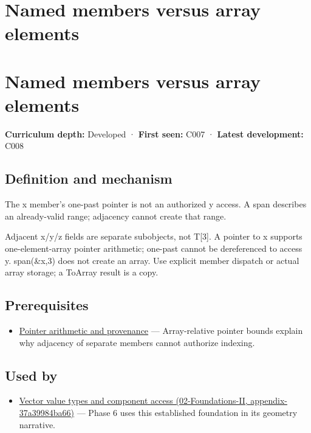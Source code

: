 \hypertarget{appendix-3f7e15effba6}{}
\section*{Named members versus array elements}
\section{Named members versus array elements}\label{appendix-3f7e15effba6-named-members-versus-array-elements}

\textbf{Curriculum depth:} Developed · \textbf{First seen:} C007 · \textbf{Latest development:} C008

\subsection{Definition and mechanism}\label{appendix-3f7e15effba6-definition-and-mechanism}

The x member's one-past pointer is not an authorized y access. A span describes an already-valid range; adjacency cannot create that range.

Adjacent x/y/z fields are separate subobjects, not T{[}3{]}. A pointer to x supports one-element-array pointer arithmetic; one-past cannot be dereferenced to access y. span(\&x,3) does not create an array. Use explicit member dispatch or actual array storage; a ToArray result is a copy.

\subsection{Prerequisites}\label{appendix-3f7e15effba6-prerequisites}

\begin{itemize}
\tightlist
\item
  \hyperref[appendix-6af5921bc853]{Pointer arithmetic and provenance} --- Array-relative pointer bounds explain why adjacency of separate members cannot authorize indexing.
\end{itemize}

\subsection{Used by}\label{appendix-3f7e15effba6-used-by}

\begin{itemize}
\tightlist
\item
  \href{../02-Foundations-II/main.pdf\#nameddest=appendix-37a39984ba66}{Vector value types and component access (02-Foundations-II, appendix-37a39984ba66)} --- Phase 6 uses this established foundation in its geometry narrative.
\end{itemize}

